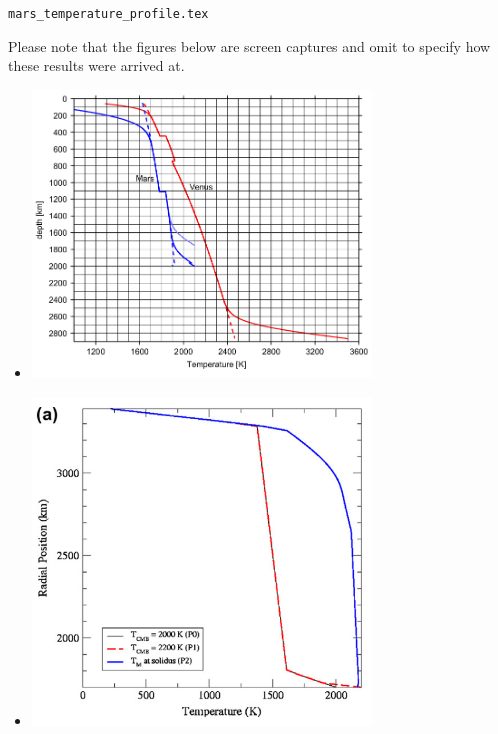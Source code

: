 \begin{flushright} {\tiny {\color{gray} \tt mars\_temperature\_profile.tex}} \end{flushright}

Please note that the figures below are screen captures and omit to 
specify how these results were arrived at. 

\begin{itemize}


\item {}

\begin{center}
\includegraphics[width=9cm]{images/mars/temperature/stwt10}
\end{center}

\item {}

\begin{center}
\includegraphics[width=9cm]{images/mars/temperature/roar12}
\end{center}


\end{itemize}
